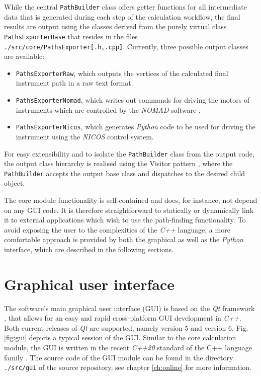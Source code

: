 While the central \lstinline[language=C++]|PathBuilder| class offers getter functions for all intermediate
data that is generated during each step of the calculation workflow, the final results are output using
the classes derived from the purely virtual class \lstinline[language=C++]|PathsExporterBase| that resides
in the files \lstinline|./src/core/PathsExporter[.h,.cpp]|. Currently, three possible output classes
are available:
\begin{itemize}
	\item \lstinline[language=C++]|PathsExporterRaw|, which outputs the vertices of the calculated 
		final instrument path in a raw text format.
	\item \lstinline[language=C++]|PathsExporterNomad|, which writes out commands for driving the
		motors of instruments which are controlled by the \textit{NOMAD} software \cite{web_NOMAD}.
	\item \lstinline[language=C++]|PathsExporterNicos|, which generates \textit{Python} code to
		be used for driving the instrument using the \textit{NICOS} \cite{web_NICOS} control system.
\end{itemize}
For easy extensibility and to isolate the \lstinline[language=C++]|PathBuilder| class from the output
code, the output class hierarchy is realised using the Visitor pattern \cite{wiki_visitor} 
\cite[Ch. 4, pp. 141-147]{FUH_prog2019}, where the \lstinline[language=C++]|PathBuilder| 
accepts the output base class and dispatches to the desired child object.

The core module functionality is self-contained and does, for instance, not depend on any GUI code.
It is therefore straightforward to statically or dynamically link it to external applications which 
wish to use the path-finding functionality. To avoid exposing the user to the complexities of 
the \textit{C++} language, a more comfortable approach is provided by both the graphical as well 
as the \textit{Python} interface, which are described in the following sections.



\section{Graphical user interface}
\label{sec:gui}
The software's main graphical user interface (GUI) is based on the \textit{Qt} framework 
\cite{web_Qt}, that allows for an easy and rapid cross-platform GUI development in \textit{C++}. 
Both current releases of \textit{Qt} are supported, namely version 5 and version 6.
Fig. \ref{fig:gui} depicts a typical session of the GUI.
Similar to the core calculation module, the GUI is written in the recent \textit{C++20}
standard \cite{ISOCPP20} of the C++ language family \cite{Stroustrup2008, Stroustrup2018}.
The source code of the GUI module can be found in the directory \lstinline|./src/gui| of the
source repository, see chapter \ref{ch:online} for more information.

